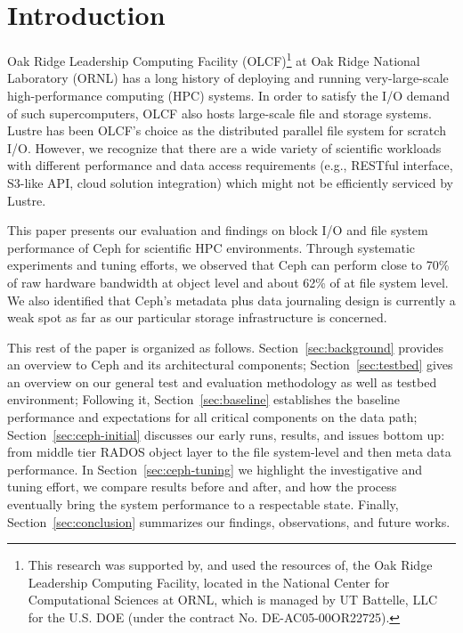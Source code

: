 \section{Introduction}

Oak Ridge Leadership Computing Facility (OLCF)\footnote{This research was
supported by, and used the resources of, the Oak Ridge Leadership Computing
Facility, located in the National Center for Computational Sciences at ORNL,
which is managed by UT Battelle, LLC for the U.S. DOE (under the contract No.
DE-AC05-00OR22725).} at Oak Ridge National Laboratory (ORNL) has a long history
of deploying and running very-large-scale high-performance computing (HPC)
systems. 
In order to satisfy the I/O demand of such supercomputers, OLCF
also hosts large-scale file and storage systems. Lustre has been OLCF's choice
as the distributed parallel file system for scratch I/O. 
However, we
recognize that there are a wide variety of scientific 
workloads with different performance and data access requirements (e.g., RESTful
interface, S3-like API, cloud solution integration) which might not be
efficiently serviced by Lustre. 

This paper presents our evaluation and findings on block I/O and file system
performance of Ceph for scientific HPC environments. Through systematic
experiments and tuning efforts, we observed that Ceph can perform close to
70\% of raw hardware bandwidth at object level and about 62\% of at file
system level. We also identified that Ceph's metadata plus data journaling
design is currently a weak spot as far as our particular storage
infrastructure is concerned.

This rest of the paper is organized as follows. Section~\ref{sec:background}
provides an overview to Ceph and its architectural components;
Section~\ref{sec:testbed} gives an overview on our general test and evaluation
methodology as well as testbed environment; Following it,
Section~\ref{sec:baseline} establishes the baseline performance and
expectations for all critical components on the data path;
Section~\ref{sec:ceph-initial} discusses our early runs, results, and issues
bottom up: from middle tier RADOS object layer to the file system-level and
then meta data performance. In Section~\ref{sec:ceph-tuning} we highlight the
investigative and tuning effort, we compare results before and after, and how
the process eventually bring the system performance to a respectable state.
Finally, Section~\ref{sec:conclusion} summarizes our findings, observations,
and future works.
